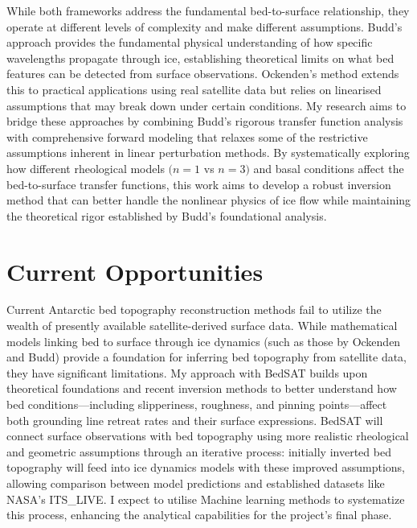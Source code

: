 While both frameworks address the fundamental bed-to-surface relationship, they operate at different levels of complexity and make different assumptions. Budd's approach provides the fundamental physical understanding of how specific wavelengths propagate through ice, establishing theoretical limits on what bed features can be detected from surface observations. Ockenden's method extends this to practical applications using real satellite data but relies on linearised assumptions that may break down under certain conditions. My research aims to bridge these approaches by combining Budd's rigorous transfer function analysis with comprehensive forward modeling that relaxes some of the restrictive assumptions inherent in linear perturbation methods. By systematically exploring how different rheological models $(n = 1$ vs $n = 3)$ and basal conditions affect the bed-to-surface transfer functions, this work aims to develop a robust inversion method that can better handle the nonlinear physics of ice flow while maintaining the theoretical rigor established by Budd's foundational analysis.

\section{Current Opportunities}

Current Antarctic bed topography reconstruction methods fail to utilize the wealth of presently available satellite-derived surface data. While mathematical models linking bed to surface through ice dynamics (such as those by Ockenden and Budd) provide a foundation for inferring bed topography from satellite data, they have significant limitations. My approach with BedSAT builds upon theoretical foundations and recent inversion methods to better understand how bed conditions—including slipperiness, roughness, and pinning points—affect both grounding line retreat rates and their surface expressions. BedSAT will connect surface observations with bed topography using more realistic rheological and geometric assumptions through an iterative process: initially inverted bed topography will feed into ice dynamics models with these improved assumptions, allowing comparison between model predictions and established datasets like NASA's ITS\_LIVE. I expect to utilise Machine learning methods to systematize this process, enhancing the analytical capabilities for the project's final phase.

